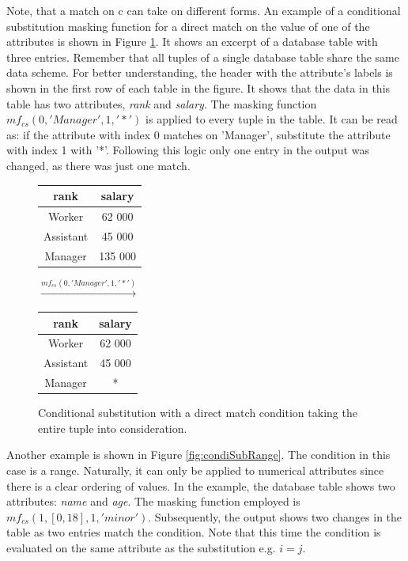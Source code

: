 Note, that a match on c can take on different forms. An example of a conditional substitution masking function for a direct match on the value of one of the attributes is shown in Figure \ref{fig:condiSubValue}. It shows an excerpt of a database table with three entries. Remember that all tuples of a single database table share the same data scheme. For better understanding, the header with the attribute's labels is shown in the first row of each table in the figure. It shows that the data in this table has two attributes, \textit{rank} and \textit{salary}. The masking function $mf_{cs}(0, 'Manager', 1, '*')$ is applied to every tuple in the table. It can be read as: if the attribute with index 0 matches on 'Manager', substitute the attribute with index 1 with '*'. Following this logic only one entry in the output was changed, as there was just one match.

\bigskip

\begin{figure}[ht]
    \begin{center}
    \footnotesize{
        \renewcommand{\arraystretch}{1.5}
        \begin{tabular}{|c|c|}
            \hline
            rank & salary\\
            \hline
            Worker & 62 000 \\
            \hline
            Assistant & 45 000 \\
            \hline
            Manager & 135 000 \\
            \hline
        \end{tabular}
        \quad $\xrightarrow{mf_{cs}(0, 'Manager', 1, '*')}$ \quad
        \begin{tabular}{|c|c|}
            \hline
            rank & salary\\
            \hline
            Worker & 62 000 \\
            \hline
            Assistant & 45 000 \\
            \hline
            Manager & * \\
            \hline
        \end{tabular}
    }
    \end{center}
    \caption{Conditional substitution with a direct match condition taking the entire tuple into consideration.\label{fig:condiSubValue}}
\end{figure}

Another example is shown in Figure \ref{fig:condiSubRange}. The condition in this case is a range. Naturally, it can only be applied to numerical attributes since there is a clear ordering of values. In the example, the database table shows two attributes: \textit{name} and \textit{age}. The masking function employed is $mf_{cs}(1,[0, 18], 1, 'minor')$. Subsequently, the output shows two changes in the table as two entries match the condition. Note that this time the condition is evaluated on the same attribute as the substitution e.g. $i = j$. 


